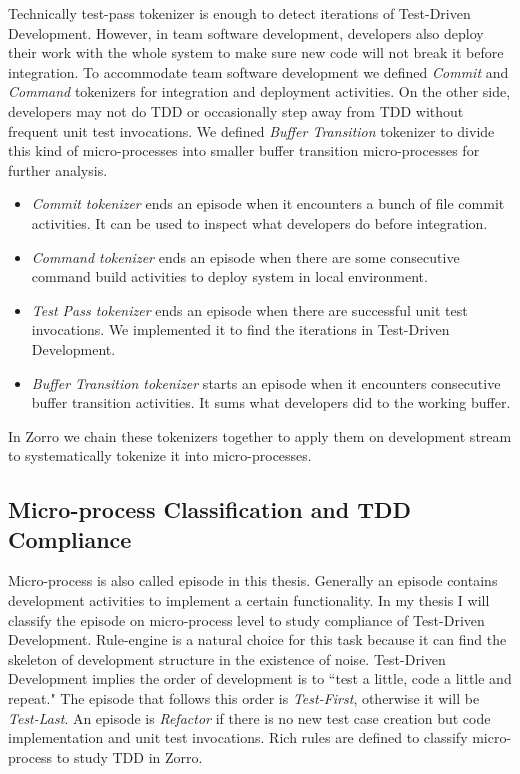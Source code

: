 Technically test-pass tokenizer is enough to detect iterations of
Test-Driven Development. However, in team software development, developers
also deploy their work with the whole system to make sure new code will not
break it before integration. To accommodate team software development we
defined \textit{Commit} and \textit{Command} tokenizers for integration and
deployment activities. On the other side, developers may not do TDD or
occasionally step away from TDD without frequent unit test invocations. We
defined \textit{Buffer Transition} tokenizer to divide this kind of
micro-processes into smaller buffer transition micro-processes for further
analysis.

\begin{itemize}
\item \textit{Commit tokenizer} ends an episode when it encounters a bunch
  of file commit activities. It can be used to inspect what developers do
  before integration.
\item \textit{Command tokenizer} ends an episode when there are some
  consecutive command build activities to deploy system in local
  environment.
\item \textit{Test Pass tokenizer} ends an episode when there are
  successful unit test invocations. We implemented it to find the iterations
  in Test-Driven Development.
\item \textit{Buffer Transition tokenizer} starts an episode when it
  encounters consecutive buffer transition activities. It sums what
  developers did to the working buffer.
\end{itemize}

In Zorro we chain these tokenizers together to apply them on development
stream to systematically tokenize it into micro-processes.

\subsection{Micro-process Classification and TDD Compliance}
Micro-process is also called episode in this thesis. Generally an episode
contains development activities to implement a certain functionality. In my
thesis I will classify the episode on micro-process level to study
compliance of Test-Driven Development. Rule-engine is a natural choice for
this task because it can find the skeleton of development structure in the
existence of noise. Test-Driven Development implies the order of
development is to ``test a little, code a little and repeat."\cite{Beck:03}
The episode that follows this order is \textit{Test-First}, otherwise it
will be \textit{Test-Last}. An episode is \textit{Refactor} if there is no
new test case creation but code implementation and unit test invocations.
Rich rules are defined to classify micro-process to study TDD in Zorro.


